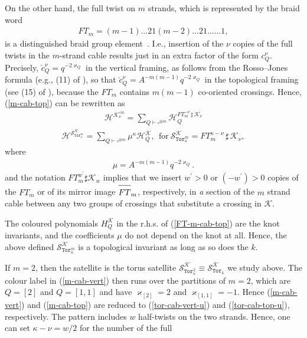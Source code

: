 \documentclass[11pt]{article}
\def\be{\begin{eqnarray}}
\def\ee{\end{eqnarray}}
\def\Hm{\mathcal{H}}
\def\Km{\mathcal{K}}
\def\Sm{\mathcal{S}}
\def\Tor{\mathtt{Tor}}
\begin{document}
On the other hand, the full twist on $m$ strands, which is represented by the braid word  %
\be FT_m=(m\!-\!1)\ldots21(m\!-\!2)\ldots21\ldots\ldots1,\ee is a distinguished braid group element~\cite{torFT,KalFT}. I.e., insertion of the $\nu$ copies of the full twists in the $m$-strand cable results just in an extra factor of the form $c_Q^{\nu}$. Precisely, $\check{c}_Q^{\nu}=q^{-2\varkappa_Q}$ in the vertical framing, as follows from the Rosso--Jones formula (e.g., (11) of \cite{AMev}), so that $\check{c}_Q^{\nu}= A^{-m(m-1)}q^{-2\varkappa_Q}$ in the topological framing (see (15) of \cite{AMev}), because the $FT_m$ contains $m(m-1)$ co-oriented crossings. Hence, (\ref{m-cab-top}) can be rewritten as
\be 
\Hm^{\Km_{\nu}^{\circ m}}=\sum_{Q\vdash \square^{\otimes m}}\Hm_Q^{FT^{-\nu}_m\,\sharp\,\Km_{\nu}}%
\ee
\be
\Hm^{\Sm_{\Tor^m_{\kappa}}^{\Km}}=\sum_{Q\vdash \square^{\otimes m}}\mu^{\kappa}\Hm_Q^{\Km},\ \ \mbox{for}\ 
\Sm_{\Tor^m_{\kappa}}^{\Km}=FT^{\kappa-{\nu}}_m\,\sharp\,\Km_{\nu},\label{FT-m-cab-top}
\ee
where
\be \mu=A^{-m(m-1)}q^{-2\varkappa_Q}.\ee
and the notation $FT^{w^{\prime}}_m\sharp\Km_w$ implies that we insert $w^{\prime}>0$ or $(-\!w^{\prime})>0$ copies of the $FT_m$ or of its mirror image $\overline{\rule{0pt}{3.5mm}FT}_m$, respectively, in \textit{a} section of the $m$ strand cable between any two groups of crossings that substitute a  crossing in $\Km$.  

The coloured polynomials $H_Q^{\Km}$ in the r.h.s. of (\ref{FT-m-cab-top}) are the knot invariants, and the coefficients $\mu$ do not depend on the knot at all. Hence, the above defined $\Sm_{\Tor^m_{\kappa}}^{\Km}$ is a topological invariant as long as so does the $k$.


If $m=2$, then the satellite is the torus satellite $\Sm_{\Tor^2_{\kappa}}^{\Km}\equiv\Sm_{\Tor_k}^{\Km}$ we study above. The colour label in (\ref{m-cab-vert}) then runs over the partitions of $m=2$, which are $Q=[2]$ and $Q=[1,1]$ and have $\varkappa_{[2]}=2$ and $\varkappa_{[1,1]}=-1$. Hence (\ref{m-cab-vert}) and (\ref{m-cab-top}) are reduced to (\ref{tor-cab-vert-u}) and (\ref{tor-cab-top-u}), respectively. The pattern includes $w$ half-twists on the two strands. Hence, one can set $\kappa-\nu=w/2$ for the number of the full
\end{document}
